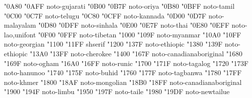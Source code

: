 \documentclass{article}
\begin{document}
                                       {  "0A80} {  "0AFF} {noto-gujarati}
                                          {  "0B00} {  "0B7F} {noto-oriya}
                                          {  "0B80} {  "0BFF} {noto-tamil}
                                         {  "0C00} {  "0C7F} {noto-telugu}
                                        {  "0C80} {  "0CFF} {noto-kannada}
                                      {  "0D00} {  "0D7F} {noto-malayalam}
                                        {  "0D80} {  "0DFF} {noto-sinhala}
                                           {  "0E00} {  "0E7F} {noto-thai}
                                            {  "0E80} {  "0EFF} {noto-lao,unifont}
                                        {  "0F00} {  "0FFF} {noto-tibetan}
                                        {  "1000} {  "109F} {noto-myanmar}
                                       {  "10A0} {  "10FF} {noto-georgian}
                                    {  "1100} {  "11FF} {shserif}
                                       {  "1200} {  "137F} {noto-ethiopic}
                            {  "1380} {  "139F} {noto-ethiopic}
                                       {  "13A0} {  "13FF} {noto-cherokee}
          {  "1400} {  "167F} {noto-canadianaboriginal}
                                          {  "1680} {  "169F} {noto-ogham}
                                          {  "16A0} {  "16FF} {noto-runic}
                                        {  "1700} {  "171F} {noto-tagalog}
                                        {  "1720} {  "173F} {noto-hanunoo}
                                          {  "1740} {  "175F} {noto-buhid}
                                       {  "1760} {  "177F} {noto-tagbanwa}
                                          {  "1780} {  "17FF} {noto-khmer}
                                      {  "1800} {  "18AF} {noto-mongolian}
 {  "18B0} {  "18FF} {noto-canadianaboriginal}
                                          {  "1900} {  "194F} {noto-limbu}
                                         {  "1950} {  "197F} {noto-taile}
                                    {  "1980} {  "19DF} {noto-newtailue}
\end{document}
